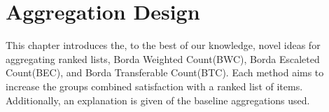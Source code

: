 \chapter{Aggregation Design}

This chapter introduces the, to the best of our knowledge, novel ideas for aggregating ranked lists, Borda Weighted Count(BWC), Borda Escaleted Count(BEC), and Borda Transferable Count(BTC). Each method aims to increase the groups combined satisfaction with a ranked list of items. Additionally, an explanation is given of the baseline aggregations used.


